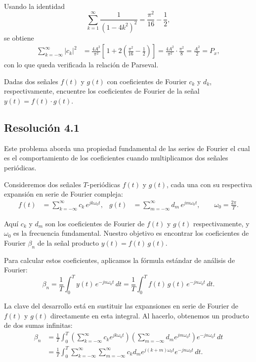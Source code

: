 \documentclass[
  11pt,
  letterpaper,
   addpoints,
   answers
  ]{exam}
\begin{document}
\begin{questions}
\begin{solution}
\begin{align}
\end{align}
Usando la identidad
\begin{equation}
\sum_{k=1}^{\infty}\frac{1}{(1-4k^2)^2}
=\frac{\pi^2}{16}-\frac{1}{2},
\end{equation}
se obtiene
\begin{align}
\sum_{k=-\infty}^{\infty}|c_k|^2
&=\frac{4A^2}{\pi^2}\left[\,1+2\!\left(\frac{\pi^2}{16}-\frac{1}{2}\right)\right]
=\frac{4A^2}{\pi^2}\cdot\frac{\pi^2}{8}
=\frac{A^2}{2}
=P_x,
\end{align}
con lo que queda verificada la relación de Parseval.
\end{solution}
\question Dadas dos señales $f(t)$ y $g(t)$ con coeficientes de Fourier $c_k$ y $d_k$, respectivamente, encuentre los coeficientes de Fourier de la señal $y(t) = f(t) \cdot g(t)$.
\begin{solution}
\subsection*{Resolución 4.1}

Este problema aborda una propiedad fundamental de las series de Fourier el cual es el comportamiento de los coeficientes cuando multiplicamos dos señales periódicas.

Consideremos dos señales \(T\)-periódicas \(f(t)\) y \(g(t)\), cada una con su respectiva expansión en serie de Fourier compleja:
\begin{align}
f(t) &= \sum_{k=-\infty}^{\infty} c_k\,e^{jk\omega_0 t}, &
g(t) &= \sum_{m=-\infty}^{\infty} d_m\,e^{jm\omega_0 t}, \qquad \omega_0=\frac{2\pi}{T}.
\end{align}

Aquí \(c_k\) y \(d_m\) son los coeficientes de Fourier de \(f(t)\) y \(g(t)\) respectivamente, y \(\omega_0\) es la frecuencia fundamental. Nuestro objetivo es encontrar los coeficientes de Fourier \(\beta_n\) de la señal producto \(y(t)=f(t)\,g(t)\).

Para calcular estos coeficientes, aplicamos la fórmula estándar de análisis de Fourier:
\begin{equation}
\beta_n=\frac{1}{T}\int_{0}^{T} y(t)\,e^{-jn\omega_0 t}\,dt
= \frac{1}{T}\int_{0}^{T} f(t)\,g(t)\,e^{-jn\omega_0 t}\,dt .
\end{equation}

La clave del desarrollo está en sustituir las expansiones en serie de Fourier de \(f(t)\) y \(g(t)\) directamente en esta integral. Al hacerlo, obtenemos un producto de dos sumas infinitas:
\begin{align}
\beta_n
&= \frac{1}{T}\int_{0}^{T} 
\left(\sum_{k=-\infty}^{\infty} c_k e^{jk\omega_0 t}\right)
\left(\sum_{m=-\infty}^{\infty} d_m e^{jm\omega_0 t}\right)
e^{-jn\omega_0 t}\,dt \\
&= \frac{1}{T}\int_{0}^{T} 
\sum_{k=-\infty}^{\infty}\sum_{m=-\infty}^{\infty} 
c_k d_m e^{j(k+m)\omega_0 t} e^{-jn\omega_0 t}\,dt.
\end{align}


\end{solution}
\end{questions}
\end{document}
